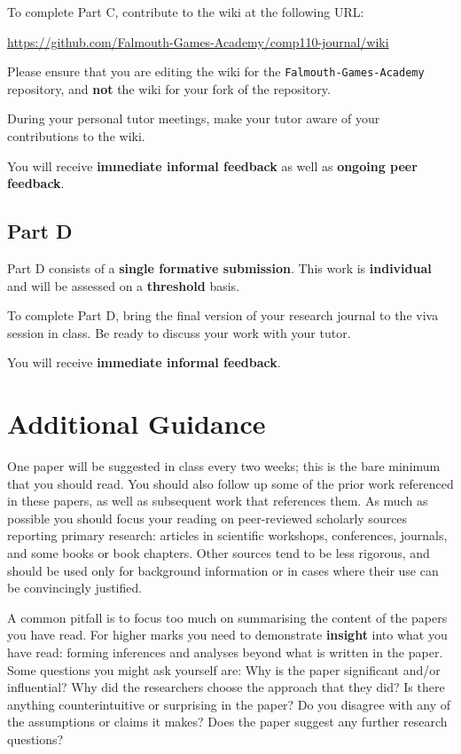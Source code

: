 \documentclass{../../fal_assignment}
\begin{document}
To complete Part C, contribute to the wiki at the following URL:

\url{https://github.com/Falmouth-Games-Academy/comp110-journal/wiki}

Please ensure that you are editing the wiki for the \texttt{Falmouth-Games-Academy} repository,
and \textbf{not} the wiki for your fork of the repository.

During your personal tutor meetings, make your tutor aware of your contributions to the wiki.

You will receive \textbf{immediate informal feedback} as well as \textbf{ongoing peer feedback}.

\subsection*{Part D}

Part D consists of a \textbf{single formative submission}. This work is \textbf{individual} and will be assessed on a \textbf{threshold} basis.

To complete Part D, bring the final version of your research journal to the viva session in class.
Be ready to discuss your work with your tutor.

You will receive \textbf{immediate informal feedback}.

\section*{Additional Guidance}

One paper will be suggested in class every two weeks; this is the bare minimum that you should read.
You should also follow up some of the prior work referenced in these papers,
as well as subsequent work that references them.
As much as possible you should focus your reading on peer-reviewed scholarly sources reporting primary research:
articles in scientific workshops, conferences, journals, and some books or book chapters.
Other sources tend to be less rigorous, and should be used only for background information
or in cases where their use can be convincingly justified.

A common pitfall is to focus too much on summarising the content of the papers you have read.
For higher marks you need to demonstrate \textbf{insight} into what you have read:
forming inferences and analyses beyond what is written in the paper.
Some questions you might ask yourself are:
Why is the paper significant and/or influential?
Why did the researchers choose the approach that they did?
Is there anything counterintuitive or surprising in the paper?
Do you disagree with any of the assumptions or claims it makes?
Does the paper suggest any further research questions?
\end{document}
